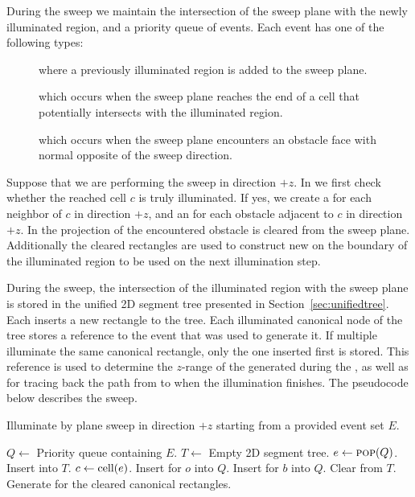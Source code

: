 \documentclass[english,gradu]{tktltiki2018}
\begin{document}
During the sweep we maintain the intersection of the sweep plane with the newly illuminated region, and a priority queue of events.
Each event has one of the following types:

\begin{description}
\item[\addE] where a previously illuminated region is added to the sweep plane.
\item[\cellE] which occurs when the sweep plane reaches the end of a cell that potentially intersects with the illuminated region.
\item[\obsE] which occurs when the sweep plane encounters an obstacle face with normal opposite of the sweep direction.
\end{description}

Suppose that we are performing the sweep in direction $+z$.
In \cellE we first check whether the reached cell $c$ is truly illuminated.
If yes, we create a \cellE for each neighbor of $c$ in direction $+z$, and an \obsE for each obstacle adjacent to $c$ in direction $+z$.
In \obsE the projection of the encountered obstacle is cleared from the sweep plane.
Additionally the cleared rectangles are used to construct new \addEs on the boundary of the illuminated region to be used on the next illumination step.

During the sweep, the intersection of the illuminated region with the sweep plane is stored in the unified 2D segment tree presented in Section~\ref{sec:unifiedtree}.
Each \addE inserts a new rectangle to the tree.
Each illuminated canonical node of the tree stores a reference to the event that was used to generate it.
If multiple \addEs illuminate the same canonical rectangle, only the one inserted first is stored.
This reference is used to determine the $z$-range of the \addEs generated during the \obsEs, as well as for tracing back the path from \ept to \spt when the illumination finishes.
The pseudocode below describes the sweep.

\begin{alg}\label{alg:sweep3d}
Illuminate by plane sweep in direction $+z$ starting from a provided event set $E$.
\begin{algorithmic}
\State $Q\gets$ Priority queue containing $E$.
\State $T\gets$ Empty 2D segment tree.
	\State $e\gets\textsc{pop}(Q)$.
		\State Insert  into $T$.
			\State $c\gets\text{cell}(e)$.
				\State Insert \obsE for $o$ into $Q$.
			\EndFor
				\State Insert \cellE for $b$ into $Q$.
			\EndFor
		\EndIf
		\State Clear  from $T$.
		\State Generate \addEs for the cleared canonical rectangles.
	\EndIf
\EndWhile
\end{algorithmic}
\end{alg}
\end{document}
